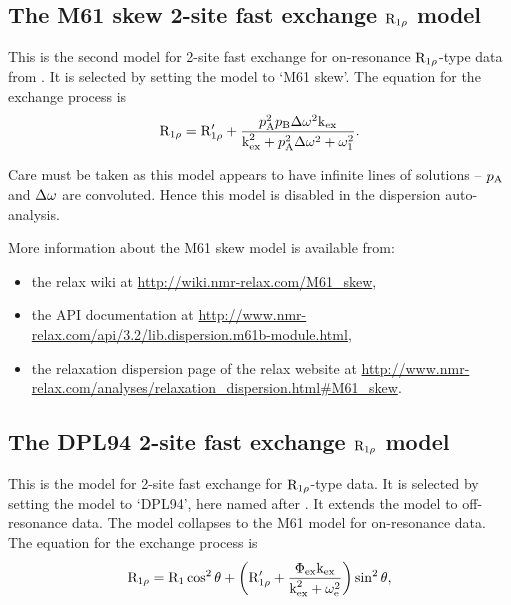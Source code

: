 
\subsection{The M61 skew 2-site fast exchange $\mathrm{R}_{1\rho}$ model}
\label{sect: dispersion: M61 skew model}

This is the second model for 2-site fast exchange for on-resonance $\mathrm{R}_{1\rho}$-type data from \citet{Meiboom61}.
It is selected by setting the model to `M61 skew'.
The equation for the exchange process is
\begin{equation}
    \mathrm{R}_{1\rho} = \mathrm{R}_{1\rho}' + \frac{p_{\textrm{A}}^2p_{\textrm{B}}\Delta\omega^2\textrm{k}_{\textrm{ex}}}{\textrm{k}_{\textrm{ex}}^2 + p_{\textrm{A}}^2\Delta\omega^2 + \omega_1^2}.
\end{equation}

Care must be taken as this model appears to have infinite lines of solutions -- $p_{\textrm{A}}$ and $\Delta\omega$ are convoluted.
Hence this model is disabled in the dispersion auto-analysis.

More information about the M61 skew model is available from:
\begin{itemize}
  \item the relax wiki at \url{http://wiki.nmr-relax.com/M61\_skew},
  \item the API documentation at \url{http://www.nmr-relax.com/api/3.2/lib.dispersion.m61b-module.html},
  \item the relaxation dispersion page of the relax website at \url{http://www.nmr-relax.com/analyses/relaxation\_dispersion.html#M61\_skew}.
\end{itemize}



\subsection{The DPL94 2-site fast exchange $\mathrm{R}_{1\rho}$ model}
\label{sect: dispersion: DPL94 model}

This is the model for 2-site fast exchange for $\mathrm{R}_{1\rho}$-type data.
It is selected by setting the model to `DPL94', here named after \citet{Davis94}.
It extends the \citet{Meiboom61} model to off-resonance data.
The model collapses to the M61 model for on-resonance data.
The equation for the exchange process is
\begin{equation}
    \mathrm{R}_{1\rho} = \mathrm{R}_1 \cos^2\theta  +  \left( \mathrm{R}_{1\rho}' + \frac{\Phi_{\textrm{ex}}\textrm{k}_{\textrm{ex}}}{\textrm{k}_{\textrm{ex}}^2 + \omega_{\textrm{e}}^2} \right) \sin^2\theta,
\end{equation}

